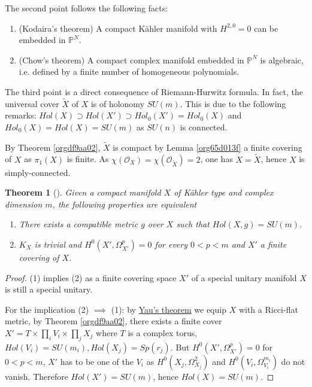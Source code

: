 \documentclass[11pt]{article}
\newtheorem{theorem}{Theorem}
\begin{document}
The second point follows the following facts:
\begin{enumerate}
\item (Kodaira's theorem) A compact Kähler manifold with \(H^{2,0}=0\) can be embedded in \(\mathbb{P}^N\).
\item (Chow's theorem) A compact complex manifold embedded in \(\mathbb{P}^N\) is algebraic,
i.e. defined by a finite number of homogeneous polynomials.
\end{enumerate}


The third point is a direct consequence of Riemann-Hurwitz formula. In fact, the universal cover
\(\tilde X\) of \(X\) is of holonomy \(SU(m)\). This is due to the following remarks: \(Hol(X)\supset
Hol(X')\supset Hol_0(X') = Hol_0(X)\) and \(Hol_0(X) = Hol(X) = SU(m)\) as \(SU(n)\) is connected.

By Theorem \ref{orgdf9aa02}, \(\tilde X\) is compact by Lemma \ref{org65d013f} a finite covering of
\(X\) as \(\pi_1(X)\) is finite. As \(\chi(\mathcal{O}_X) = \chi(\mathcal{O}_{\tilde X}) = 2\), one has \(X
= \tilde X\), hence \(X\) is simply-connected.



\begin{theorem}[]
\label{thm:SU-alg}
\label{org69e0400}
Given a compact manifold \(X\) of Kähler type and complex dimension \(m\), the following properties are equivalent
\begin{enumerate}
\item There exists a compatible metric \(g\) over \(X\) such that \(Hol(X,g) = SU(m)\).
\item \(K_X\) is trivial and \(H^0(X', \Omega_{X'}^p) =0\) for every \(0 < p < m\) and \(X'\) a finite covering of \(X\).
\end{enumerate}
\end{theorem}

\begin{proof}
(1) implies (2) as a finite covering space \(X'\) of a special unitary manifold \(X\) is still a special
unitary. 

For the implication (2) \(\implies\) (1): by \href{calabi-yau.org}{Yau's theorem} we equip \(X\) with a Ricci-flat metric, by
Theorem \ref{orgdf9aa02}, there exists a finite cover \(X' = T\times \prod_i V_i\times \prod_j X_j\)
where \(T\) is a complex torus, \(Hol(V_i) = SU(m_i), Hol(X_j) = Sp(r_j)\). But
\(H^0(X',\Omega^p_{X'})=0\) for \(0<p<m\), \(X'\) has to be one of the \(V_i\) as
\(H^0(X_j,\Omega_{X_j}^{2})\) and \(H^0(V_i,\Omega_{V_i}^{m_i})\) do not vanish. Therefore \(Hol(X') =
SU(m)\), hence \(Hol(X) = SU(m)\).
\end{proof}
\end{document}
